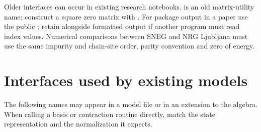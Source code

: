 Older interfaces can occur in existing research notebooks.
 is an old matrix-utility name; construct a square
zero matrix with . For package output in
a paper use the public ; retain  alongside
formatted output if another program must read index values. Numerical
comparisons between SNEG and NRG Ljubljana must use the same impurity
and chain-site order, parity convention and zero of energy.

\section{Interfaces used by existing models}
The following names may appear in a model file or in an extension to
the algebra. When calling a basis or contraction routine directly,
match the state representation and the normalization it expects.

